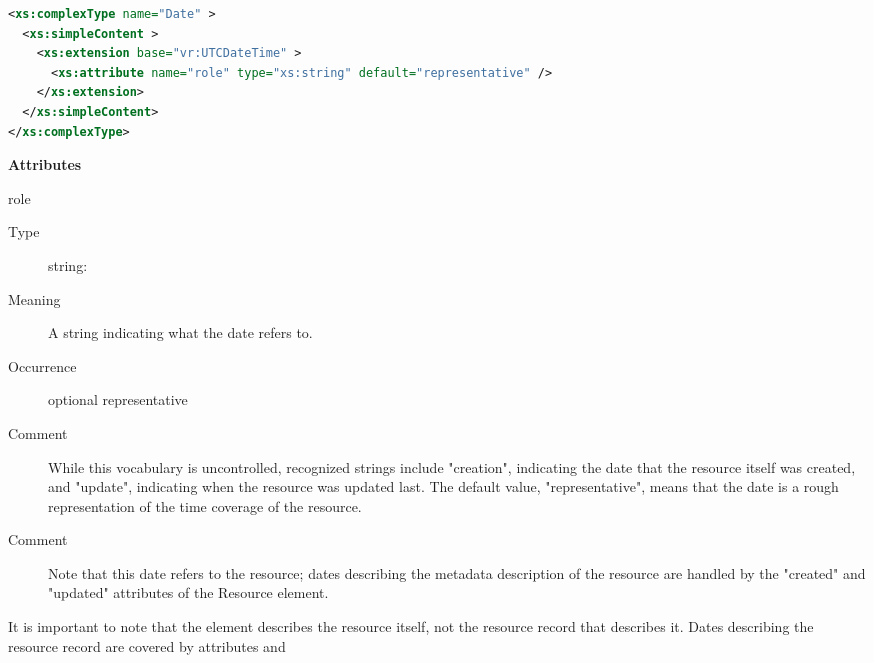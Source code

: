 \documentclass[11pt,a4paper]{ivoa}
\begin{document}
\begin{lstlisting}[language=XML,basicstyle=\footnotesize]
<xs:complexType name="Date" >
  <xs:simpleContent >
    <xs:extension base="vr:UTCDateTime" >
      <xs:attribute name="role" type="xs:string" default="representative" />
    </xs:extension>
  </xs:simpleContent>
</xs:complexType>
\end{lstlisting}

\vspace{0.5ex}\noindent\textbf{ Attributes}

\begingroup\small\begin{bigdescription}
\item[role]
\begin{description}
\item[Type] string: 
\item[Meaning] 
                 A string indicating what the date refers to.  
               
\item[Occurrence] optional
representative
\item[Comment] 
                 While this vocabulary is uncontrolled, recognized strings 
                 include {"}creation{"}, indicating the date that the resource 
                 itself was created, and {"}update{"}, indicating when the
                 resource was updated last.  The default value, 
                 {"}representative{"}, means that the date is a rough 
                 representation of the time coverage of the resource.
               
\item[Comment] 
                 Note that this date refers to the resource; dates describing
                 the metadata description of the resource are handled by
                 the {"}created{"} and {"}updated{"} attributes of the Resource 
                 element. 
               
\end{description}


\end{bigdescription}\endgroup

\endgroup


It is important to note that the  element describes the
resource itself, not the resource record that describes it.  Dates
describing the resource record are covered by 
attributes  and 
\end{document}
